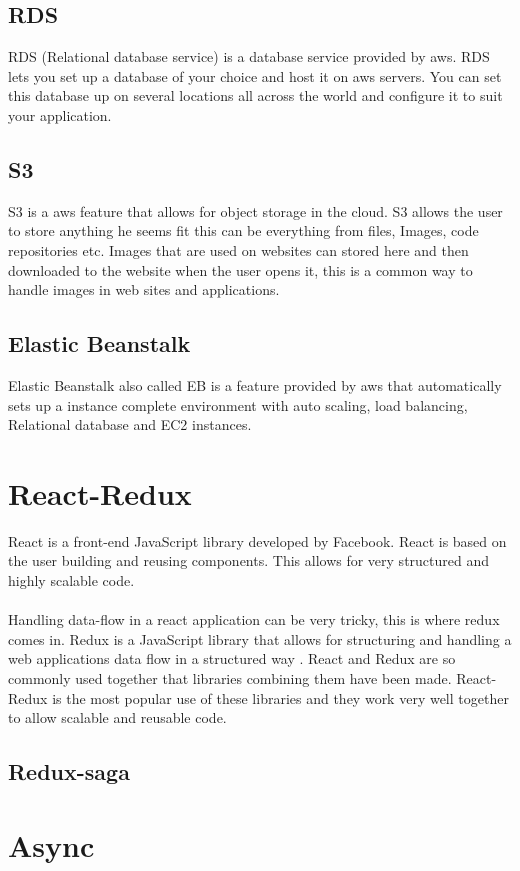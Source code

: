 \subsection{RDS}
RDS (Relational database service) is a database service provided by aws. RDS lets you set up a database of your choice and host it on aws servers. You can set this database up on several locations all across the world and configure it to suit your application.
\subsection{S3}
S3 is a aws feature that allows for object storage in the cloud. S3 allows the user to store anything he seems fit this can be everything from files, Images, code repositories etc. Images that are used on websites can stored here and then downloaded to the website when the user opens it, this is a common way to handle images in web sites and applications.
\subsection{Elastic Beanstalk}
Elastic Beanstalk also called EB is a feature provided by aws that automatically sets up a instance complete environment with auto scaling, load balancing, Relational database and EC2 instances.
\section{React-Redux}
React is a front-end JavaScript library developed by Facebook. React is based on the user building and reusing components. This allows for very structured and highly scalable code.
\\\\
Handling data-flow in a react application can be very tricky, this is where redux comes in. Redux is a JavaScript library that allows for structuring and handling a web applications data flow in a structured way . React and Redux are so commonly used together that libraries combining them have been made. React-Redux is the most popular use of these libraries and they work very well together to allow scalable and reusable code. 
\subsection{Redux-saga}

\section{Async}
